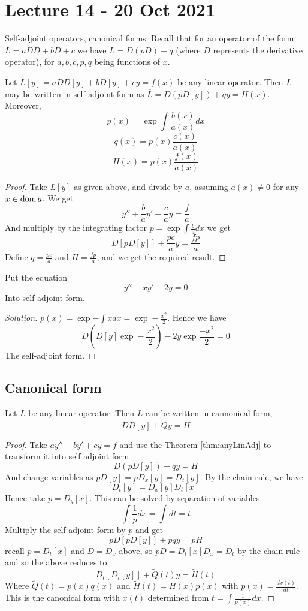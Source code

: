 \section{Lecture 14 - 20 Oct 2021}
Self-adjoint operators, canonical forms.
Recall that for an operator of the form $L=aDD+bD+c$ we have $\overline{L}=D(pD) + q$
(where $D$ represents the derivative operator), for $a,b,c,p,q$ being functions of $x$.
\begin{theorem}
  Let $L[y]=aDD[y]+bD[y]+cy=f(x)$ be any linear operator. Then $L$ may be written in
  self-adjoint form as $\overline{L}=D(pD[y]) + qy=H(x)$. Moreover, 
  \[p(x)=\exp{\int\frac{b(x)}{a(x)}dx}\]
  \[q(x)=p(x)\frac{c(x)}{a(x)}\]
  \[H(x)=p(x)\frac{f(x)}{a(x)}\]
  \label{thm:anyLinAdj}
\end{theorem}
\begin{proof}
  Take $L[y]$ as given above, and divide by $a$, assuming $a(x)\neq 0$ for any $x\in\operatorname{dom}
  a$. We get
  \[y''+\frac{b}{a}y'+\frac{c}{a}y = \frac{f}{a}\]
  And multiply by the integrating factor $p=\exp{\int\frac{b}{a}dx}$ we get
  \[D[pD[y]]+\frac{pc}{a}y = \frac{fp}{a}\]
  Define $q=\frac{pc}{a}$ and $H=\frac{fp}{a}$, and we get the required result.
\end{proof}


\begin{example}
  Put the equation 
  \[y''-xy'-2y=0\]
  Into self-adjoint form.
\end{example}
\begin{proof}[Solution]
  $p(x)=\exp{-\int x dx}=\exp -\frac{x^2}{2}$. Hence we have 
  \[D(D[y]\exp -\frac{x^2}{2}) - 2y\exp \frac{-x^2}{2}=0\]
  The self-adjoint form.
\end{proof}

\subsection{Canonical form}

\begin{theorem}
  Let $L$ be any linear operator. Then $L$ can be written in cannonical form,
  \[DD[y] + \tilde{Q}y = \tilde{H}\]
  \label{thm:anyLinCan}
\end{theorem}
\begin{proof}
  Take $ay''+by'+cy=f$ and use the Theorem \ref{thm:anyLinAdj} to transform it into self
  adjoint form
  \[D(pD[y]) +qy=H\]
  And change variables as $pD[y]=pD_x[y]=D_t[y]$. By the chain rule, we have 
  \[D_t[y]= D_x[y]D_t[x]\]
  Hence take $p=D_y[x]$. This can be solved by separation of variables
  \[\int \frac{1}{p}dx = \int dt=t\]
  Multiply the self-adjoint form by $p$ and get 
  \[pD[pD[y]]+pqy = pH\]
  recall $p=D_t[x]$ and $D=D_x$ above, so $pD=D_t[x]D_x=D_t$ by the chain rule and so  the
  above reduces to 
  \[D_t[D_t[y]]+\tilde{Q}(t)y=\tilde{H}(t)\]
  Where $\tilde{Q}(t)=p(x)q(x)$ and $\tilde{H}(t)=H(x)p(x)$ with
  $p(x)=\frac{dx(t)}{dt}$. This is the canonical form with $x(t)$ determined from $t=\int
  \frac{1}{p(x)}dx$.
\end{proof}


